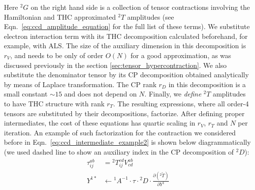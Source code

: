 Here ${}^2G$ on the right hand side is a collection of tensor contractions 
involving the Hamiltonian and THC approximated ${}^2T$ amplitudes 
(see Eqn.~\ref{eq:ccd_amplitude_equation} for the full list of these terms).
We substitute electron interaction term with its THC decomposition calculated 
beforehand, for example, with ALS. The size of the auxiliary dimension in 
this decomposition is $r_{V}$, and needs to be only of order $O(N)$ for a good 
approximation, as was discussed previously in the section 
\ref{sec:tensor_hypercontraction}. We also substitute the denominator tensor by 
its CP decomposition obtained analytically by means of Laplace transformation. 
The CP rank $r_{D}$ in this decomposition is a small constant $\sim 15$ and 
does not depend on $N$. Finally, we \emph{define} ${}^2T$ amplitudes to have 
THC structure with rank $r_{T}$. The resulting expressions, where all order-4 
tensors are substituted by their decompositions, factorize. After defining 
proper intermediates, the cost of these equations has quartic scaling in 
$r_{V}$, $r_{T}$ and $N$ per iteration. An example of such factorization 
for the contraction we considered before 
in Eqn.~\ref{eq:ccd_intermediate_example2} is 
shown below diagrammatically (we used dashed line to show an auxiliary 
index in the CP decomposition of ${}^2 D$):
\begin{equation}
\begin{split}
\tau^{ab}_{ij} & = {}^2 T^{cd}_{ij} V^{ab}_{cd} \\
Y^{1 \ast} &\longleftarrow {}^1A^{-1} \cdot \tau \cdot {}^{2}D 
\cdot \frac{\partial ({}^2\tilde{T})}{\partial Y^{1}}
\end{split}
\end{equation}
%
